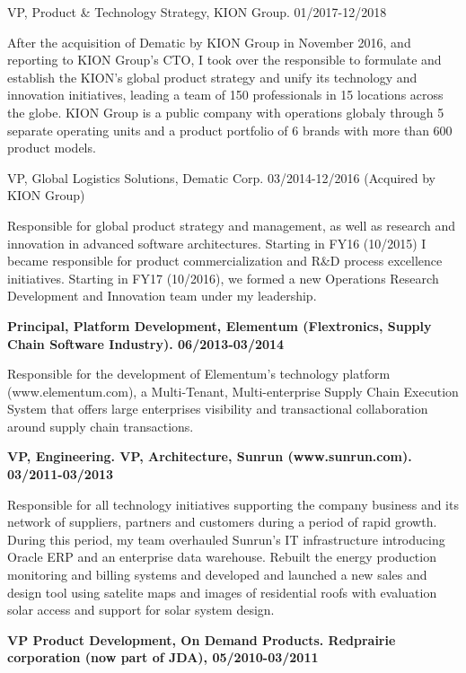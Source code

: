 \documentclass{res}
\begin{document}
\begin{resume}
\begin{bf}
VP, Product \& Technology Strategy, KION Group. 01/2017-12/2018
\end{bf}

After the acquisition of Dematic by KION Group in November 2016, and reporting to KION Group's CTO, I took over the responsible to formulate and establish the KION's global product strategy and unify its technology and innovation initiatives, leading a team of 150 professionals in 15 locations across the globe. KION Group is a public company with operations globaly through 5 separate operating units and a product portfolio of 6 brands with more than 600 product models.

\begin{bf}
VP, Global Logistics Solutions, Dematic Corp. 03/2014-12/2016
(Acquired by KION Group)
\end{bf}

Responsible for global product strategy and management, as well as research and innovation in advanced software architectures. Starting in FY16 (10/2015) I became responsible for product commercialization and R\&D process excellence initiatives. Starting in FY17 (10/2016), we formed a new Operations Research Development and Innovation team under my leadership.

{\bf Principal, Platform Development, Elementum (Flextronics, Supply Chain Software Industry). 06/2013-03/2014}

Responsible for the development of Elementum's technology platform (www.elementum.com), a Multi-Tenant, Multi-enterprise Supply Chain Execution System that offers large enterprises visibility and transactional collaboration around supply chain transactions.


{\bf VP, Engineering. VP, Architecture, Sunrun (www.sunrun.com). 03/2011-03/2013}

Responsible for all technology initiatives supporting the company business and its network of suppliers, partners and customers during a period of rapid growth. During this period, my team overhauled Sunrun's IT infrastructure introducing Oracle ERP and an enterprise data warehouse. Rebuilt the energy production monitoring and billing systems and developed and launched a new sales and design tool using satelite maps and images of residential roofs with evaluation solar access and support for solar system design.


{\bf VP Product Development, On Demand Products. Redprairie corporation (now part of JDA), 05/2010-03/2011}


\end{resume}
\end{document}
